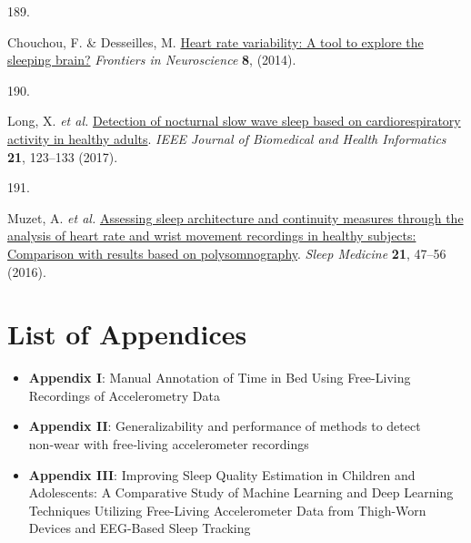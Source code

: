 \documentclass[
  10pt,
]{scrbook}
\newlength{\cslhangindent}
\newlength{\csllabelwidth}
\newlength{\cslentryspacingunit} %
\newenvironment{CSLReferences}[2] %
 {%
  \setlength{\parindent}{0pt}
  \ifodd #1
  \let\oldpar\par
  \def\par{\hangindent=\cslhangindent\oldpar}
  \fi
  \setlength{\parskip}{#2\cslentryspacingunit}
 }%
 {}
\newcommand{\CSLLeftMargin}[1]{\parbox[t]{\csllabelwidth}{#1}}
\newcommand{\CSLRightInline}[1]{\parbox[t]{\linewidth - \csllabelwidth}{#1}\break}
\let\originaltextbf\textbf
\renewcommand{\textbf}[1]{\textcolor{color1}{\textsf{\originaltextbf{#1}}}}
\begin{document}
\begin{CSLReferences}{0}{0}
\leavevmode{}%
\CSLLeftMargin{189. }%
\CSLRightInline{Chouchou, F. \& Desseilles, M.
\href{https://www.frontiersin.org/articles/10.3389/fnins.2014.00402}{Heart
rate variability: A tool to explore the sleeping brain?} \emph{Frontiers
in Neuroscience} \textbf{8}, (2014).}

\leavevmode{}%
\CSLLeftMargin{190. }%
\CSLRightInline{Long, X. \emph{et al.}
\href{https://doi.org/10.1109/JBHI.2015.2487446}{Detection of nocturnal
slow wave sleep based on cardiorespiratory activity in healthy adults}.
\emph{IEEE Journal of Biomedical and Health Informatics} \textbf{21},
123--133 (2017).}

\leavevmode{}%
\CSLLeftMargin{191. }%
\CSLRightInline{Muzet, A. \emph{et al.}
\href{https://doi.org/10.1016/j.sleep.2016.01.015}{Assessing sleep
architecture and continuity measures through the analysis of heart rate
and wrist movement recordings in healthy subjects: Comparison with
results based on polysomnography}. \emph{Sleep Medicine} \textbf{21},
47--56 (2016).}

\end{CSLReferences}

\hypertarget{list-of-appendices}{%
\chapter{List of Appendices}\label{list-of-appendices}}

\begin{itemize}
\item
  \textbf{Appendix I}: Manual Annotation of Time in Bed Using
  Free-Living Recordings of Accelerometry Data
\item
  \textbf{Appendix II}: Generalizability and performance of methods to
  detect non‑wear with free‑living accelerometer recordings
\item
  \textbf{Appendix III}: Improving Sleep Quality Estimation in Children
  and Adolescents: A Comparative Study of Machine Learning and Deep
  Learning Techniques Utilizing Free-Living Accelerometer Data from
  Thigh-Worn Devices and EEG-Based Sleep Tracking
\end{itemize}

\newpage
\end{document}
